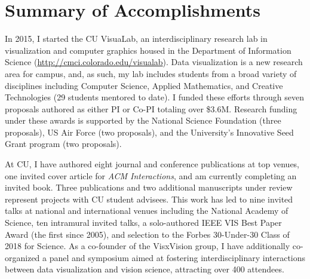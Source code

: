 \documentclass[11pt]{article}
\begin{document}

\section*{Summary of Accomplishments}

In 2015, I started the CU VisuaLab, an interdisciplinary research lab in visualization and computer graphics housed in the Department of Information Science (\href{http://cmci.colorado.edu/visualab}{http://cmci.colorado.edu/visualab}). Data visualization is a new research area for campus, and, as such, my lab includes students from a broad variety of disciplines including Computer Science, Applied Mathematics, and Creative Technologies (29 students mentored to date). I funded these efforts through seven proposals authored as either PI or Co-PI totaling over \$3.6M. Research funding under these awards is supported by the National Science Foundation (three proposals), US Air Force (two proposals), and the University's Innovative Seed Grant program (two proposals).


At CU, I have authored eight journal and conference publications at top venues, one invited cover article for \emph{ACM Interactions}, and am currently completing an invited book. Three publications and two additional manuscripts under review represent projects with CU student advisees. This work has led to nine invited talks at national and international venues including the National Academy of Science, ten intramural invited talks, a solo-authored IEEE VIS Best Paper Award (the first since 2005), and selection to the Forbes 30-Under-30 Class of 2018 for Science.  As a co-founder of the VisxVision group, I have additionally co-organized a panel and symposium aimed at fostering interdisciplinary interactions between data visualization and vision science, attracting over 400 attendees. 
\end{document}
